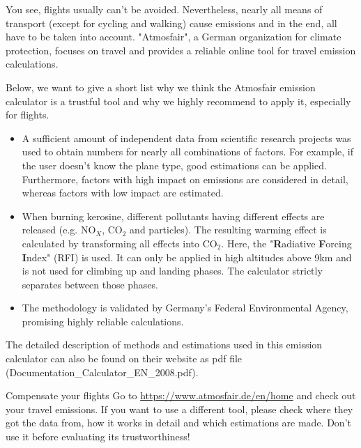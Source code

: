 You see, flights usually can't be avoided. Nevertheless, nearly all means of transport (except for cycling and walking) cause emissions and in the end, all have to be taken into account. 
"Atmosfair", a German organization for climate protection, focuses on travel and provides a reliable online tool for travel emission calculations.


Below, we want to give a short list why we think the Atmosfair emission calculator is a trustful tool and why we highly recommend to apply it, especially for flights. 

\begin{itemize}
	\item A sufficient amount of independent data from scientific research projects was used to obtain numbers for nearly all combinations of factors. For example, if the user doesn't know the plane type, good estimations can be applied. Furthermore, factors with high impact on emissions are considered in detail, whereas factors with low impact are estimated.
	
	\item When burning kerosine, different pollutants having different effects are released (e.g. NO$_X$, CO$_2$ and particles). The resulting warming effect is calculated by transforming all effects into CO$_2$. Here, the "\textbf{R}adiative \textbf{F}orcing \textbf{I}ndex" (RFI) is used. It can only be applied in high altitudes above 9km and is not used for climbing up and landing phases. The calculator strictly separates between those phases.
	
	\item The methodology is validated by Germany's Federal Environmental Agency, promising highly reliable calculations.
\end{itemize}

The detailed description of methods and estimations used in this emission calculator can also be found on their website as pdf file (Documentation\_Calculator\_EN\_2008.pdf). \cite{flight_calc}%

\begin{suggest} {Compensate your flights}
	Go to \url{https://www.atmosfair.de/en/home} and check out your travel emissions. If you want to use a different tool, please check where they got the data from, how it works in detail and which estimations are made. Don't use it before evaluating its trustworthiness!
\end{suggest}
